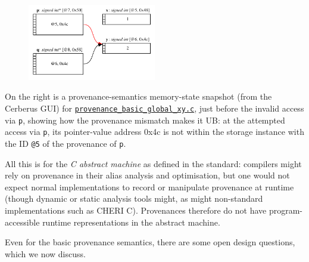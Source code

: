 \documentclass[acmsmall,review,screen]{acmart}\settopmatter{printfolios=true,printccs=false,printacmref=false}
\newcommand{\mytesturl}[1]{https://cerberus.cl.cam.ac.uk/cerberus?defacto/#1}
\newcommand{\mytestlink}[2]{\href{\mytesturl{#1}}{#2}}
\newcommand{\mylsttestlink}[1]{\mytestlink{#1}{\lstinline{#1}}}
\newcommand{\myfooexamplename}[1]{\mylsttestlink{#1}}
\begin{document}
\begin{figure}
\vspace*{-\baselineskip}
\includegraphics[width=0.5\textwidth]{provenance-basic-global-xy-memory.pdf}
\label{fig:pbweb-interface}
\vspace*{-2\baselineskip}
\end{figure}

On the right is a provenance-semantics memory-state snapshot
(from the Cerberus GUI)
for \myfooexamplename{provenance_basic_global_xy.c},
just before the invalid access via \lstinline{p}, showing how the
provenance mismatch makes it UB: at the attempted access via
\lstinline{p}, its pointer-value address 0x4c is not within the
storage instance with the ID \lstinline{@5} of the provenance of
\lstinline{p}.

All this is for the \emph{C abstract machine} as defined in the
standard: compilers might rely on provenance in their alias analysis and
optimisation, but one would not expect normal implementations to record
or manipulate provenance at runtime (though dynamic or static analysis
tools might, as might non-standard implementations such as CHERI
C). Provenances therefore do not have program-accessible runtime representations in the abstract
machine.  


Even for the basic provenance semantics, there are some open design
questions, which we now discuss.
\end{document}
